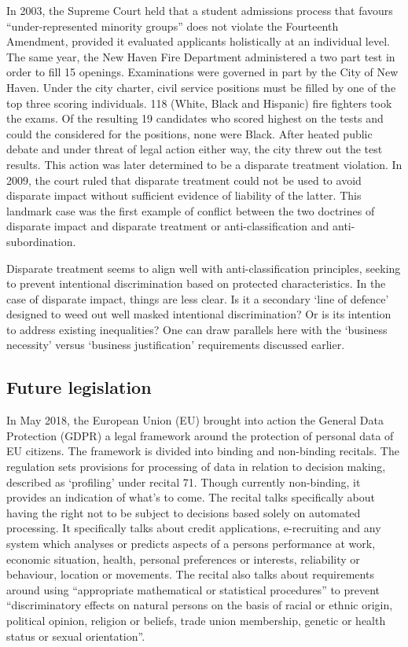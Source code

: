 In 2003, the Supreme Court held that a student admissions process that favours ``under-represented minority groups'' does not violate the Fourteenth Amendment\cite{UnderRepStudents}, provided it evaluated applicants holistically at an individual level. The same year, the New Haven Fire Department administered a two part test in order to fill 15 openings. Examinations were governed in part by the City of New Haven. Under the city charter, civil service positions must be filled by one of the top three scoring individuals. 118 (White, Black and Hispanic) fire fighters took the exams. Of the resulting 19 candidates who scored highest on the tests and could the considered for the positions, none were Black. After heated public debate and under threat of legal action either way, the city threw out the test results. This action was later determined to be a disparate treatment violation. In 2009, the court ruled that disparate treatment could not be used to avoid disparate impact without sufficient evidence of liability of the latter\cite{FireFighters}. This landmark case was the first example of conflict between the two doctrines of disparate impact and disparate treatment or anti-classification and anti-subordination.

Disparate treatment seems to align well with anti-classification principles, seeking to prevent intentional discrimination based on protected characteristics. In the case of disparate impact, things are less clear. Is it a secondary `line of defence' designed to weed out well masked intentional discrimination? Or is its intention to address existing inequalities? One can draw parallels here with the `business necessity' versus `business justification' requirements discussed earlier.

\subsection{Future legislation}

In May 2018, the European Union (EU) brought into action the General Data Protection (GDPR) a legal framework around the protection of personal data of EU citizens. The framework is divided into binding and non-binding recitals. The regulation sets provisions for processing of data in relation to decision making, described as `profiling' under recital 71\cite{GDPR}. Though currently non-binding, it provides an indication of what's to come. The recital talks specifically about having the right not to be subject to decisions based solely on automated processing. It specifically talks about credit applications, e-recruiting and any system which analyses or predicts aspects of a persons performance at work, economic situation, health, personal preferences or interests, reliability or behaviour, location or movements. The recital also talks about requirements around using ``appropriate mathematical or statistical procedures'' to prevent ``discriminatory effects on natural persons on the basis of racial or ethnic origin, political opinion, religion or beliefs, trade union membership, genetic or health status or sexual orientation''.

